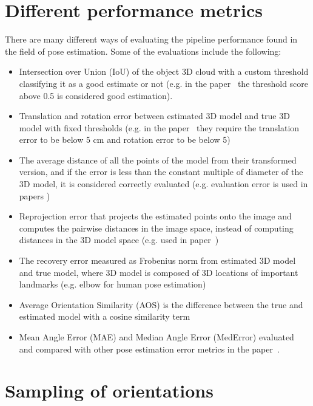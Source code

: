 \clearpage

\section{Different performance metrics}\label{apx:metrics-review}


There are many different ways of evaluating the pipeline performance found in the field of pose estimation. Some of the evaluations include the following:
\begin{itemize}
\item Intersection over Union (IoU) of the object 3D cloud with a custom threshold classifying it as a good estimate or not (e.g. in the paper~\cite{10.1007/s11263-014-0733-5} the threshold score above 0.5 is considered good estimation).
\item Translation and rotation error between estimated 3D model and true 3D model with fixed thresholds (e.g. in the paper~\cite{shotton2013scene} they require the translation error to be below 5 cm and rotation error to be below 5\degree)
\item The average distance of all the points of the model from their transformed version, and if the error is less than the constant multiple of diameter of the 3D model, it is considered correctly evaluated (e.g. evaluation error is used in papers \cite{10.1007/978-3-642-37331-2_42, xiang2018posecnn})
\item Reprojection error that projects the estimated points onto the image and computes the pairwise distances in the image space, instead of computing distances in the 3D model space (e.g. used in paper~\cite{xiang2018posecnn})
\item The recovery error measured as Frobenius norm from estimated 3D model and true model, where 3D model is composed of 3D locations of important landmarks (e.g. elbow for human pose estimation)~\cite{wangni2018monocular}
\item Average Orientation Similarity (AOS) is the difference between the true and estimated model with a cosine similarity term~\cite{RedondoCabrera2016PoseEE}
\item Mean Angle Error (MAE) and Median Angle Error (MedError) evaluated and compared with other pose estimation error metrics in the paper~\cite{RedondoCabrera2016PoseEE}.
\end{itemize}

\section{Sampling of orientations}\label{apx:orientation-sampling}

